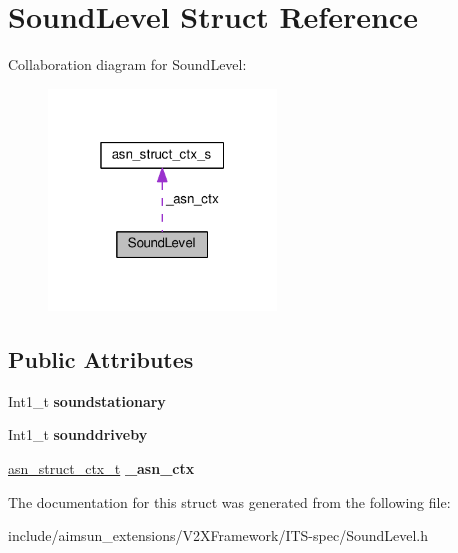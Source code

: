 \hypertarget{structSoundLevel}{}\section{Sound\+Level Struct Reference}
\label{structSoundLevel}


Collaboration diagram for Sound\+Level\+:\nopagebreak
\begin{figure}[H]
\begin{center}
\leavevmode
\includegraphics[width=172pt]{structSoundLevel__coll__graph}
\end{center}
\end{figure}
\subsection*{Public Attributes}
\begin{DoxyCompactItemize}
\item 
Int1\+\_\+t {\bfseries soundstationary}\hypertarget{structSoundLevel_a3c4dfb53aeabdcdf2dda9848ffd8292c}{}\label{structSoundLevel_a3c4dfb53aeabdcdf2dda9848ffd8292c}

\item 
Int1\+\_\+t {\bfseries sounddriveby}\hypertarget{structSoundLevel_ad4b713d35c783cb6f1f8ee89478fd401}{}\label{structSoundLevel_ad4b713d35c783cb6f1f8ee89478fd401}

\item 
\hyperlink{structasn__struct__ctx__s}{asn\+\_\+struct\+\_\+ctx\+\_\+t} {\bfseries \+\_\+asn\+\_\+ctx}\hypertarget{structSoundLevel_adcf07324b04f9eb5496602add5bbbb3d}{}\label{structSoundLevel_adcf07324b04f9eb5496602add5bbbb3d}

\end{DoxyCompactItemize}


The documentation for this struct was generated from the following file\+:\begin{DoxyCompactItemize}
\item 
include/aimsun\+\_\+extensions/\+V2\+X\+Framework/\+I\+T\+S-\/spec/Sound\+Level.\+h\end{DoxyCompactItemize}
